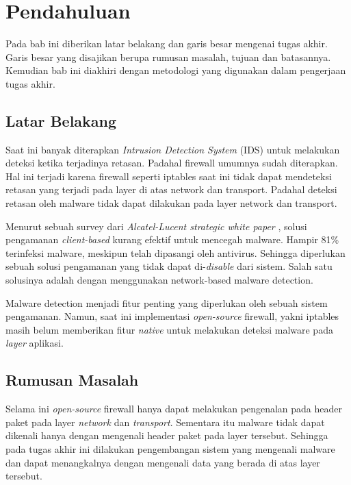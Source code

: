 \chapter{Pendahuluan}

Pada bab ini diberikan latar belakang dan garis besar mengenai tugas akhir. Garis besar yang disajikan berupa rumusan masalah, tujuan dan batasannya. Kemudian bab ini diakhiri dengan metodologi yang digunakan dalam pengerjaan tugas akhir.

\section{Latar Belakang}

Saat ini banyak diterapkan \textit{Intrusion Detection System} (IDS) untuk melakukan deteksi ketika terjadinya retasan. Padahal firewall umumnya sudah diterapkan. Hal ini terjadi karena firewall seperti iptables saat ini tidak dapat mendeteksi retasan yang terjadi pada layer di atas network dan transport. Padahal deteksi retasan oleh malware tidak dapat dilakukan pada layer network dan transport.

Menurut sebuah survey dari \textit{Alcatel-Lucent strategic white paper} \cite{alcatel_lucent_2013}, solusi pengamanan \textit{client-based} kurang efektif untuk mencegah malware. Hampir 81\% terinfeksi malware, meskipun telah dipasangi oleh antivirus. Sehingga diperlukan sebuah solusi pengamanan yang tidak dapat di-\textit{disable} dari sistem. Salah satu solusinya adalah dengan menggunakan network-based malware detection.

Malware detection menjadi fitur penting yang diperlukan oleh sebuah sistem pengamanan. Namun, saat ini implementasi \textit{open-source} firewall, yakni iptables masih belum memberikan fitur \textit{native} untuk melakukan deteksi malware pada \textit{layer} aplikasi.

\section{Rumusan Masalah}

Selama ini \textit{open-source} firewall hanya dapat melakukan pengenalan pada header paket pada layer \textit{network} dan \textit{transport}. Sementara itu malware tidak dapat dikenali hanya dengan mengenali header paket pada layer tersebut. Sehingga pada tugas akhir ini dilakukan pengembangan sistem yang mengenali malware dan dapat menangkalnya dengan mengenali data yang berada di atas layer tersebut.


